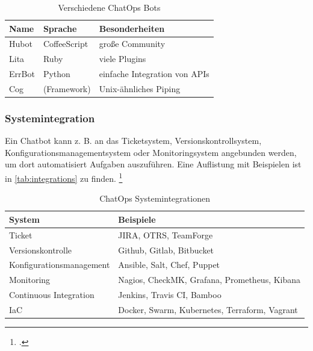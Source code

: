 \begin{table}[H]
\centering
\begin{tabularx}{.8\textwidth}{l|l|X}
  Name & Sprache & Besonderheiten\\\hline
  Hubot & CoffeeScript & große Community\\
  Lita & Ruby & viele Plugins\\
  ErrBot & Python & einfache Integration von APIs\\
  Cog & (Framework) & Unix-ähnliches Piping\\
\end{tabularx}
\caption{Verschiedene ChatOps Bots}
\label{tab:bots}
\end{table}


\subsubsection{Systemintegration}
Ein Chatbot kann z. B. an das Ticketsystem, Versionskontrollsystem, Konfigurationsmanagementsystem oder Monitoringsystem angebunden werden, um dort automatisiert Aufgaben auszuführen. Eine Auflistung mit Beispielen ist in \autoref{tab:integrations} zu finden.
\footcite[Vgl.][o. \pno]{Zyane_2017_ChatOps}

\begin{table}[H]
\centering
\begin{tabularx}{.8\textwidth}{l|X}
  System & Beispiele \\\hline
  Ticket& JIRA, OTRS, TeamForge \\
  Versionskontrolle & Github, Gitlab, Bitbucket\\
  Konfigurationsmanagement & Ansible, Salt, Chef, Puppet\\
  Monitoring & Nagios, CheckMK, Grafana, Prometheus, Kibana\\
  Continuous Integration & Jenkins, Travis CI, Bamboo\\
  \acf{IaC} & Docker, Swarm, Kubernetes, Terraform, Vagrant\\
\end{tabularx}
\caption{ChatOps Systemintegrationen}
\label{tab:integrations}
\end{table}

